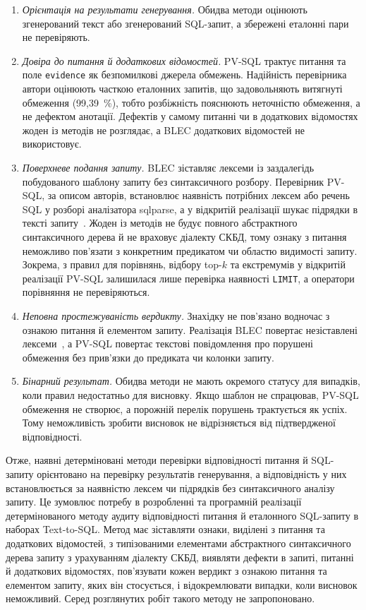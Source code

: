 \documentclass[a4paper,14pt,oneside]{extreport}
\begin{document}
\begin{enumerate}\setlength{\itemsep}{0pt}\setlength{\parsep}{0pt}\setlength{\parskip}{0pt}
\item \textit{Орієнтація на результати генерування.} Обидва методи оцінюють згенерований текст або згенерований SQL-запит, а збережені еталонні пари не перевіряють.
\item \textit{Довіра до питання й додаткових відомостей.} PV-SQL трактує питання та поле \texttt{evidence} як безпомилкові джерела обмежень. Надійність перевірника автори оцінюють часткою еталонних запитів, що задовольняють витягнуті обмеження (99,39~\%), тобто розбіжність пояснюють неточністю обмеження, а не дефектом анотації. Дефектів у самому питанні чи в додаткових відомостях жоден із методів не розглядає, а BLEC додаткових відомостей не використовує.
\item \textit{Поверхневе подання запиту.} BLEC зіставляє лексеми із заздалегідь побудованого шаблону запиту без синтаксичного розбору. Перевірник PV-SQL, за описом авторів, встановлює наявність потрібних лексем або речень SQL у розборі аналізатора sqlparse, а у відкритій реалізації шукає підрядки в тексті запиту~\cite{pvsqlRepo}. Жоден із методів не будує повного абстрактного синтаксичного дерева й не враховує діалекту СКБД, тому ознаку з питання неможливо пов'язати з конкретним предикатом чи областю видимості запиту. Зокрема, з правил для порівнянь, відбору top-$k$ та екстремумів у відкритій реалізації PV-SQL залишилася лише перевірка наявності \texttt{LIMIT}, а оператори порівняння не перевіряються.
\item \textit{Неповна простежуваність вердикту.} Знахідку не пов'язано водночас з ознакою питання й елементом запиту. Реалізація BLEC повертає незіставлені лексеми~\cite{blecRepo}, а PV-SQL повертає текстові повідомлення про порушені обмеження без прив'язки до предиката чи колонки запиту.
\item \textit{Бінарний результат.} Обидва методи не мають окремого статусу для випадків, коли правил недостатньо для висновку. Якщо шаблон не спрацював, PV-SQL обмеження не створює, а порожній перелік порушень трактується як успіх. Тому неможливість зробити висновок не відрізняється від підтвердженої відповідності.
\end{enumerate}

Отже, наявні детерміновані методи перевірки відповідності питання й SQL-запиту орієнтовано на перевірку результатів генерування, а відповідність у них встановлюється за наявністю лексем чи підрядків без синтаксичного аналізу запиту. Це зумовлює потребу в розробленні та програмній реалізації детермінованого методу аудиту відповідності питання й еталонного SQL-запиту в наборах Text-to-SQL. Метод має зіставляти ознаки, виділені з питання та додаткових відомостей, з типізованими елементами абстрактного синтаксичного дерева запиту з урахуванням діалекту СКБД, виявляти дефекти в запиті, питанні й додаткових відомостях, пов'язувати кожен вердикт з ознакою питання та елементом запиту, яких він стосується, і відокремлювати випадки, коли висновок неможливий. Серед розглянутих робіт такого методу не запропоновано.
\end{document}
